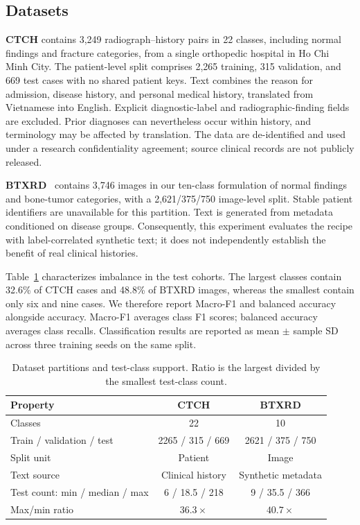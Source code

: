 \documentclass[conference,a4paper]{IEEEtran}
\begin{document}
\subsection{Datasets}
\textbf{CTCH} contains 3,249 radiograph--history pairs in 22 classes, including normal findings and fracture categories, from a single orthopedic hospital in Ho Chi Minh City. The patient-level split comprises 2,265 training, 315 validation, and 669 test cases with no shared patient keys. Text combines the reason for admission, disease history, and personal medical history, translated from Vietnamese into English. Explicit diagnostic-label and radiographic-finding fields are excluded. Prior diagnoses can nevertheless occur within history, and terminology may be affected by translation. The data are de-identified and used under a research confidentiality agreement; source clinical records are not publicly released.

\textbf{BTXRD}~\cite{Yao2025} contains 3,746 images in our ten-class formulation of normal findings and bone-tumor categories, with a 2,621/375/750 image-level split. Stable patient identifiers are unavailable for this partition. Text is generated from metadata conditioned on disease groups. Consequently, this experiment evaluates the recipe with label-correlated synthetic text; it does not independently establish the benefit of real clinical histories.

Table~\ref{tab:datasets} characterizes imbalance in the test cohorts. The largest classes contain 32.6\% of CTCH cases and 48.8\% of BTXRD images, whereas the smallest contain only six and nine cases. We therefore report Macro-F1 and balanced accuracy alongside accuracy. Macro-F1 averages class F1 scores; balanced accuracy averages class recalls. Classification results are reported as mean $\pm$ sample SD across three training seeds on the same split.

\begin{table}[t]
\caption{Dataset partitions and test-class support. Ratio is the largest divided by the smallest test-class count.}
\label{tab:datasets}
\centering\footnotesize
\begin{tabular}{@{}lcc@{}}
\toprule
Property & CTCH & BTXRD \\
\midrule
Classes & 22 & 10 \\
Train / validation / test & 2265 / 315 / 669 & 2621 / 375 / 750 \\
Split unit & Patient & Image \\
Text source & Clinical history & Synthetic metadata \\
Test count: min / median / max & 6 / 18.5 / 218 & 9 / 35.5 / 366 \\
Max/min ratio & $36.3\times$ & $40.7\times$ \\
\bottomrule
\end{tabular}
\end{table}
\end{document}
